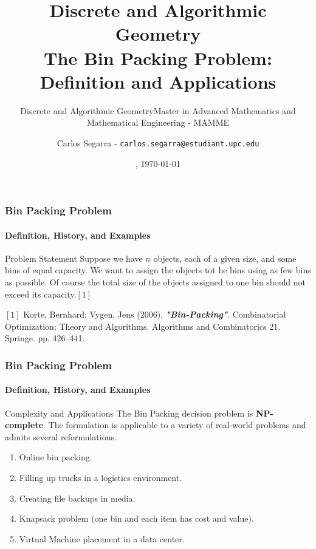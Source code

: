 \documentclass[10pt,    %
    english,            %
    xcolor=table,       %
    envcountsect,        %
    aspectratio=169     %
]{beamer}
\subtitle{Discrete and Algorithmic Geometry} %
\title[The Bin Packing Problem] %
    {\normalsize Discrete and Algorithmic Geometry \\ \Large The Bin Packing Problem: \\ \Large Definition and Applications}
\subtitle{Master in Advanced Mathematics and Mathematical Engineering - MAMME}
\date[\today] %
    {\datedayname, \today}
\author[] %
{Carlos Segarra - \texttt{carlos.segarra@estudiant.upc.edu}}
\begin{document}
\begin{frame}
  \titlepage
\end{frame}

\begin{frame}
    \frametitle{Bin Packing Problem}
    \framesubtitle{Definition, History, and Examples}

    \begin{block}{Problem Statement}
        Suppose we have $n$ objects, each of a given size, and some bins of equal capacity. We want to assign the objects tot he bins using as few bins as possible. Of course the total size of the objects assigned to one bin should not exceed its capacity.$[1]$
    \end{block}


    \small
    \begin{description}
        \item $[1]$ Korte, Bernhard; Vygen, Jens (2006). \textbf{\textit{"Bin-Packing"}}. Combinatorial Optimization: Theory and Algorithms. Algorithms and Combinatorics 21. Springe. pp. 426–441.
    \end{description}

\end{frame}

\begin{frame}
    \frametitle{Bin Packing Problem}
    \framesubtitle{Definition, History, and Examples}

    \begin{alertblock}{Complexity and Applications}
        The Bin Packing decision problem is \textbf{NP-complete}. The formulation is applicable to a variety of real-world problems and admits several reformulations.
    \end{alertblock}

    \begin{enumerate}
        \item Online bin packing.
        \item Filling up trucks in a logistics environment.
        \item Creating file backups in media.
        \item Knapsack problem (one bin and each item has cost and value).
        \item Virtual Machine placement in a data center.
    \end{enumerate}

\end{frame}
\end{document}

